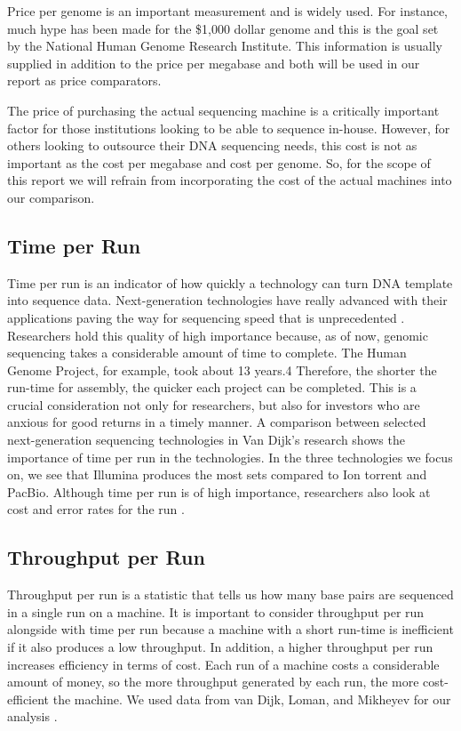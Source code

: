 \documentclass[12pt,letterpaper]{report}
\begin{document}
Price per genome is an important measurement and is widely used. For instance, much hype has been made for the \$1,000 dollar genome and this is the goal set by the National Human Genome Research Institute. This information is usually supplied in addition to the price per megabase and both will be used in our report as price comparators.

The price of purchasing the actual sequencing machine is a critically important factor for those institutions looking to be able to sequence in-house. However, for others looking to outsource their DNA sequencing needs, this cost is not as important as the cost per megabase and cost per genome. So, for the scope of this report we will refrain from incorporating the cost of the actual machines into our comparison.

\subsection{Time per Run}
	
Time per run is an indicator of how quickly a technology can turn DNA template into sequence data. Next-generation technologies have really advanced with their applications paving the way for sequencing speed that is unprecedented \cite{Bao}. Researchers hold this quality of high importance because, as of now, genomic sequencing takes a considerable amount of time to complete. The Human Genome Project, for example, took about 13 years.4 Therefore, the shorter the run-time for assembly, the quicker each project can be completed. This is a crucial consideration not only for researchers, but also for investors who are anxious for good returns in a timely manner. A comparison between selected next-generation sequencing technologies in Van Dijk's research shows the importance of time per run in the technologies\cite{Maitra}. In the three technologies we focus on, we see that Illumina produces the most sets compared to Ion torrent and PacBio. Although time per run is of high importance, researchers also look at cost and error rates for the run \cite{van_Dijk}.
     
\subsection{Throughput per Run}
Throughput per run is a statistic that tells us how many base pairs are sequenced in a single run on a machine. It is important to consider throughput per run alongside with time per run because a machine with a short run-time is inefficient if it also produces a low throughput. In addition, a higher throughput per run increases efficiency in terms of cost. Each run of a machine costs a considerable amount of money, so the more throughput generated by each run, the more cost-efficient the machine. We used data from van Dijk, Loman, and Mikheyev for our analysis \cite{van_Dijk,Loman,Mikheyev}.
\end{document}
